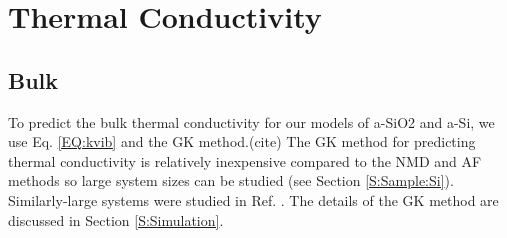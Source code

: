 \documentclass[aps,prb,onecolumn,preprint,superscriptaddress,footinbib,amsmath,amssymb,floatfix]{revtex4}
\begin{document}


\section{\label{S:Conductivity}Thermal Conductivity}

\subsection{\label{S:Bulk}Bulk}

To predict the bulk thermal conductivity for our models of a-SiO2 and 
a-Si, we use Eq. \eqref{EQ:kvib} 
and the GK method.(cite) The GK method for predicting 
thermal conductivity
is relatively inexpensive compared to the NMD and AF methods so  
large system sizes can be studied (see Section \ref{S:Sample:Si}).  
Similarly-large 
systems were studied in Ref. . The details of the 
GK method are discussed in Section \ref{S:Simulation}. 
\end{document}
